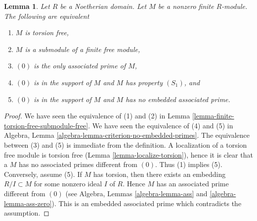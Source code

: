 \documentclass[10pt,a4paper]{amsart}
\theoremstyle{plain}
\newtheorem{lemma}[subsection]{Lemma}
\theoremstyle{definition}
\theoremstyle{remark}
\numberwithin{equation}{subsection}
\begin{document}
\begin{lemma}
\label{lemma-torsion-free-finite-noetherian-domain}
Let $R$ be a Noetherian domain. Let $M$ be a nonzero finite $R$-module.
The following are equivalent
\begin{enumerate}
\item $M$ is torsion free,
\item $M$ is a submodule of a finite free module,
\item $(0)$ is the only associated prime of $M$,
\item $(0)$ is in the support of $M$ and $M$ has property $(S_1)$, and
\item $(0)$ is in the support of $M$ and $M$ has no embedded associated prime.
\end{enumerate}
\end{lemma}

\begin{proof}
We have seen the equivalence of (1) and (2) in
Lemma \ref{lemma-finite-torsion-free-submodule-free}.
We have seen the equivalence of (4) and (5) in
Algebra, Lemma \ref{algebra-lemma-criterion-no-embedded-primes}.
The equivalence between (3) and (5) is immediate from the definition.
A localization of a torsion free module is torsion free
(Lemma \ref{lemma-localize-torsion}), hence it is clear that a
$M$ has no associated primes different from $(0)$. Thus (1)
implies (5). Conversely, assume (5). If $M$ has torsion,
then there exists an embedding $R/I \subset M$ for some nonzero
ideal $I$ of $R$. Hence $M$ has an associated prime different
from $(0)$
(see Algebra, Lemmas \ref{algebra-lemma-ass} and \ref{algebra-lemma-ass-zero}).
This is an embedded associated prime which contradicts the assumption.
\end{proof}
\end{document}
